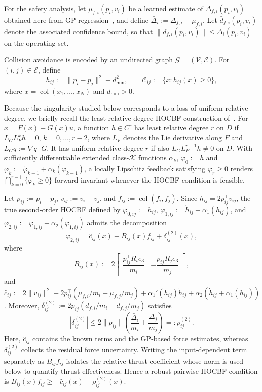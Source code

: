 \documentclass[journal,twoside,web]{ieeecolor}
\begin{document}
For the safety analysis, let $\mu_{f,i}(p_i,v_i)$ be a learned
estimate of $\Delta_{f,i}(p_i,v_i)$ obtained here from GP
regression~\cite{rasmussen2006gpml}, and define
$\bar\Delta_i:=\Delta_{f,i}-\mu_{f,i}$. Let $\bar d_{f,i}(p_i,v_i)$ denote the associated
confidence bound, so that $\|d_{f,i}(p_i,v_i)\|\le
\bar\Delta_i(p_i,v_i)$ on the operating set.

Collision avoidance is encoded by an undirected graph
$\mathcal G=(\mathcal V,\mathcal E)$. For $(i,j)\in\mathcal E$,
define
\begin{equation}
    h_{ij}:=\|p_i-p_j\|^2-d_{\min}^2,
    \qquad
    \mathcal C_{ij}:=\{x:h_{ij}(x)\ge0\},
    \label{eq:hij}
\end{equation}
where $x=\operatorname{col}(x_1,\ldots,x_N)$ and
$d_{\min}>0$.

Because the singularity studied below corresponds to a loss of uniform relative degree, we briefly recall the
least-relative-degree HOCBF construction of~\cite{tan2022highorder}. For
$\dot x=F(x)+G(x)u$, a function $h\in C^r$ has least
relative degree $r$ on $D$ if
$L_GL_F^kh=0$, $k=0,\ldots,r-2$, where $L_F$ denotes
the Lie derivative along $F$ and
$L_Gq:=\nabla q^\top G$. It has uniform relative degree
$r$ if also $L_GL_F^{r-1}h\neq0$ on $D$. With sufficiently differentiable extended class-$\mathcal K$
functions $\alpha_k$,
$\varphi_0:=h$ and
$\varphi_k:=\dot\varphi_{k-1}+\alpha_k(\varphi_{k-1})$,
a locally Lipschitz feedback satisfying $\varphi_r\ge0$
renders
$\bigcap_{k=0}^{r-1}\{\varphi_k\ge0\}$ forward invariant
whenever the HOCBF condition is feasible. 


 Let $p_{ij}:=p_i-p_j$, $v_{ij}:=v_i-v_j$, and $f_{ij}:=\operatorname{col}(f_i,f_j)$. Since $\dot h_{ij}=2p_{ij}^\top v_{ij}$, the true second-order HOCBF defined by $\varphi_{0,ij}:=h_{ij}$, $\varphi_{1,ij}:=\dot h_{ij}+\alpha_1(h_{ij})$, and $\varphi_{2,ij}:=\dot\varphi_{1,ij}+\alpha_2(\varphi_{1,ij})$ admits the decomposition \begin{equation} \varphi_{2,ij} = \widehat c_{ij}(x) +B_{ij}(x)f_{ij} +\delta_{ij}^{(2)}(x), \label{eq:pairwise_hocbf_uncertain} \end{equation} where \begin{equation} B_{ij}(x) := 2\begin{bmatrix} \dfrac{p_{ij}^\top R_ie_3}{m_i} & -\dfrac{p_{ij}^\top R_je_3}{m_j} \end{bmatrix}, \label{eq:Bij} \end{equation} and $\widehat c_{ij} :=2\|v_{ij}\|^2 +2p_{ij}^\top(\mu_{f,i}/m_i-\mu_{f,j}/m_j) +\alpha_1'(h_{ij})\dot h_{ij} +\alpha_2(\dot h_{ij}+\alpha_1(h_{ij}))$. Moreover, $\delta_{ij}^{(2)} :=2p_{ij}^\top(d_{f,i}/m_i-d_{f,j}/m_j)$ satisfies \[ \left|\delta_{ij}^{(2)}\right|\leq 2\|p_{ij}\|
\left( \frac{\bar\Delta_i}{m_i} + \frac{\bar\Delta_j}{m_j}\right)=:\rho_{ij}^{(2)}.\] Here, $\widehat c_{ij}$ contains the known terms and the
GP-based force estimates, whereas $\delta_{ij}^{(2)}$ collects
the residual force uncertainty. Writing the input-dependent
term separately as $B_{ij}f_{ij}$ isolates the relative-thrust
coefficient whose norm is used below to quantify thrust
effectiveness. Hence a robust pairwise HOCBF condition is $B_{ij}(x)f_{ij}\ge-\widehat c_{ij}(x)+\rho_{ij}^{(2)}(x)$. 
 
\end{document}
